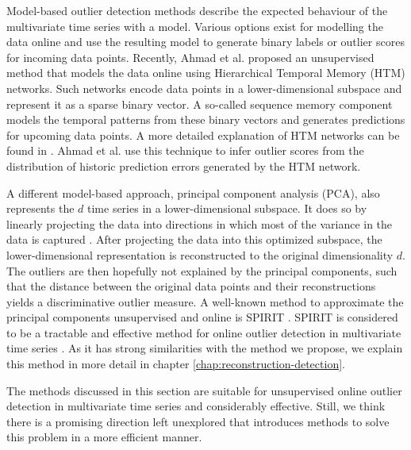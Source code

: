 \vspace{0.1cm}

Model-based outlier detection methods describe the expected behaviour of the multivariate time series with a model. Various options exist for modelling the data online and use the resulting model to generate binary labels or outlier scores for incoming data points. Recently, Ahmad et al. \cite{ahmad2017unsupervised} proposed an unsupervised method that models the data online using Hierarchical Temporal Memory (HTM) networks. Such networks encode data points in a lower-dimensional subspace and represent it as a sparse binary vector. A so-called sequence memory component models the temporal patterns from these binary vectors and generates predictions for upcoming data points. A more detailed explanation of HTM networks can be found in \cite{cui2016continuous}. Ahmad et al. use this technique to infer outlier scores from the distribution of historic prediction errors generated by the HTM network.

A different model-based approach, principal component analysis (PCA), also represents the $d$ time series in a lower-dimensional subspace. It does so by linearly projecting the data into directions in which most of the variance in the data is captured \cite{jolliffe1986principal}. After projecting the data into this optimized subspace, the lower-dimensional representation is reconstructed to the original dimensionality $d$. The outliers are then hopefully not explained by the principal components, such that the distance between the original data points and their reconstructions yields a discriminative outlier measure. A well-known method to approximate the principal components unsupervised and online is SPIRIT \cite{papadimitriou2005streaming}. SPIRIT is considered to be a tractable and effective method for online outlier detection in multivariate time series \cite{aggarwal2015outlier}. As it has strong similarities with the method we propose, we explain this method in more detail in chapter \ref{chap:reconstruction-detection}. 

The methods discussed in this section are suitable for unsupervised online outlier detection in multivariate time series and considerably effective. Still, we think there is a promising direction left unexplored that introduces methods to solve this problem in a more efficient manner.



